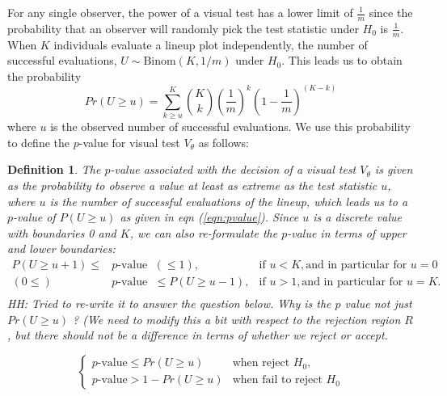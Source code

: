 \documentclass{article}
\newcommand{\blue}[1]{{\color{blue} #1}} %
\newcommand{\red}[1]{{\color{red} #1}} %
\newtheorem{dfn}{Definition}[section]
\begin{document}
\noindent For any single observer, the power of a visual test has a lower limit of $\frac1m$ since the probability that an observer will randomly pick the test statistic under $H_0$ is $\frac1m$. When $K$ individuals evaluate a lineup plot independently, the number of successful evaluations, $U \sim \text{Binom} (K,1/m)$  under $H_0$. This leads us to obtain the probability 
\begin{equation}\label{eqn:pvalue}
Pr(U \ge u)= \sum_{k \ge u}^K {{K \choose k} \left(\frac{1}{m}\right)^k\left(1-\frac 1m\right)^{(K-k)}}
\end{equation}
where $u$ is the observed number of successful evaluations. We use this probability to  define the $p$-value for visual test $V_{\theta}$ as follows:
\begin{dfn} \label{dfn:pval}
The $p$-value associated with the decision of a visual test $V_{\theta}$ is given \blue{as the probability to observe a value at least as extreme as the test statistic $u$, 
where $u$ is the number of successful evaluations of the lineup, which leads us to a $p$-value of $P(U \ge u)$ as given in eqn (\ref{eqn:pvalue}). Since $u$ is a discrete value with boundaries 0 and $K$,
 we can also re-formulate the $p$-value in terms of upper and lower boundaries:
 \begin{equation*}
 \begin{array}{rcll}
 P(U \ge u+1) \le &p\text{-value}& (\le 1), & \text{if }u < K, \text{and in particular for } u=0\\
( 0 \le) &p\text{-value}& \le P(U \ge u-1), & \text{if }u > 1, \text{and in particular for } u=K.\\ 
 \end{array}
 \end{equation*}
 }
\red{HH: Tried to re-write it to answer the question below.
Why is the $p$ value not just $Pr(U \ge u)$ ? (We need to modify this a bit with respect to the rejection region $R$, but there should not be a difference in terms of whether we reject or accept. }

    \begin{equation*}
        \begin{cases} 
              p\text{-value} \le Pr(U \ge u)    & \text{when reject $H_0$,} \\
              p\text{-value} > 1-Pr(U \ge u)  & \text{when fail to reject $H_0$}
        \end{cases}
    \end{equation*}
\end{dfn}
\end{document}
